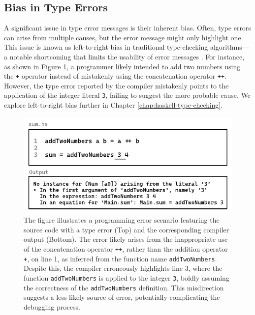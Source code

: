  \subsection*{Bias in Type Errors} 
 \label{subsec:bias}
 
A significant issue in type error messages is their inherent bias. Often, type errors can arise from multiple causes, but the error message might only highlight one. This issue is known as left-to-right bias in traditional type-checking algorithms—a notable shortcoming that limits the usability of error messages \cite{McAdam2002-vb, Lee1998-fx, Chen2014-ev}.  For instance, as shown in Figure \ref{fig:type-error-example}, a programmer likely intended to add two numbers using the \texttt{+} operator instead of mistakenly using the concatenation operator \texttt{++}. However, the type error reported by the compiler mistakenly points to the application of the integer literal \texttt{3}, failing to suggest the more probable cause. We explore left-to-right bias further in Chapter \ref{chap:haskell-type-checking}.

 \begin{figure}[htbp]
  \centering
  \includegraphics[width=\linewidth]{TypeErrorExample}
  \caption[Illustrating a programming error in Haskell, featuring a function named \texttt{addTwoNumbers} with a type error and the corresponding compiler output]{
    \label{fig:type-error-example}
    The figure illustrates a programming error scenario featuring the source code with a type error (Top) and the corresponding compiler output (Bottom). The error likely arises from the inappropriate use of the concatenation operator \texttt{++}, rather than the addition operator \texttt{+}, on line 1, as inferred from the function name \texttt{addTwoNumbers}. Despite this, the compiler erroneously highlights line 3, where the function \texttt{addTwoNumbers} is applied to the integer \texttt{3}, boldly assuming the correctness of the \texttt{addTwoNumbers} definition. This misdirection suggests a less likely source of error, potentially complicating the debugging process.
    }
\end{figure}


